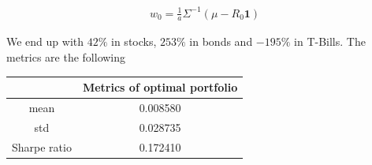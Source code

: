 \documentclass[10pt]{article}
\newenvironment{exercise}[2][Exercise]{\begin{trivlist}
  \item[\hskip \labelsep {\bfseries #1}\hskip \labelsep {\bfseries #2.}]}{\end{trivlist}}
\begin{document}
\begin{exercise}{3}
	\begin{align*}
		w_{0} = \frac{1}{a} \Sigma^{-1} (\mu  - R_{0}\textbf{1})
	\end{align*}
	
	We end up with $42\%$ in stocks, $253\%$ in bonds and $-195\%$ in T-Bills. The metrics are the following
	
	\begin{table}[h!]
		\centering
 		\begin{tabular}{||c c||} 
 			\hline
 			& Metrics of optimal portfolio \\ [0.5ex] 
 			\hline\hline
 			mean & 0.008580 \\ 
 			std & 0.028735 \\
 			Sharpe ratio & 0.172410 \\ [1ex] 
 			\hline
		 \end{tabular}
	\end{table}	

\end{exercise}
  
\end{document}
